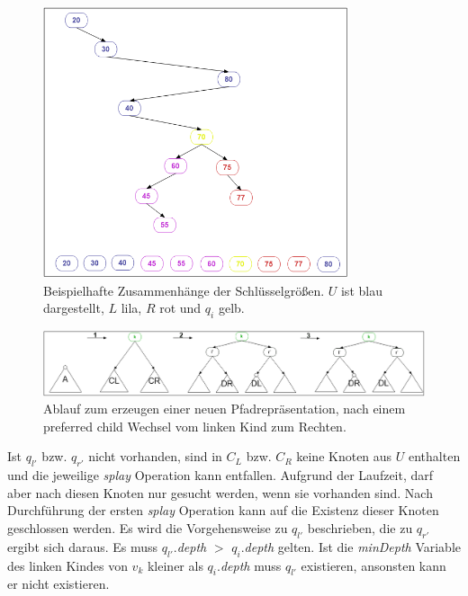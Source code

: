 \documentclass[a4paper,12pt]{article}
\begin{document}
\begin{figure}[h]
	\centering
	\includegraphics[width= 0.8\textwidth]{"Medien/Multisplay/keySpace"}
	\caption {Beispielhafte Zusammenhänge der Schlüsselgrößen. $U$ ist blau dargestellt, $L$ lila, $R$ rot und $q_i$ gelb. }
	\label{fig:keySpace}
\end{figure} 
\begin{figure}[h]
	\centering
	\includegraphics[width= 1\textwidth]{"Medien/Multisplay/split"}
	\caption {Ablauf zum erzeugen einer neuen Pfadrepräsentation, nach einem preferred child Wechsel vom linken Kind zum Rechten.}
	\label{fig:split}
\end{figure} 
\noindent Ist $q_{l'}$ bzw. $q_{r'}$ nicht vorhanden, sind in $C_L$ bzw. $C_R$ keine Knoten aus $U$ enthalten und die jeweilige \textit{splay} Operation kann entfallen. Aufgrund der Laufzeit, darf aber nach diesen Knoten nur gesucht werden, wenn sie vorhanden sind. Nach Durchführung der ersten \textit{splay} Operation  kann auf die Existenz dieser Knoten geschlossen werden. Es wird die Vorgehensweise zu  $q_{l'}$ beschrieben, die zu  $q_{r'}$ ergibt sich daraus. Es muss $q_{l'}.$\textit{depth} $>$ $q_{i}.$\textit{depth} gelten. Ist die \textit{minDepth} Variable des linken Kindes von $v_k$ kleiner als $q_{i}.$\textit{depth} muss $q_{l'}$ existieren, ansonsten kann er nicht existieren. 
\end{document}
